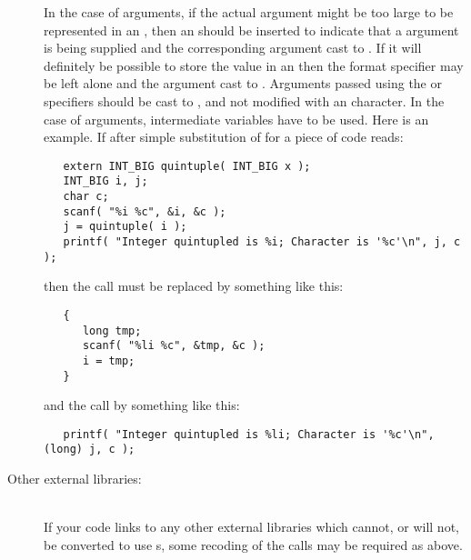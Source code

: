 \documentclass[twoside,11pt]{article}
\renewcommand{\_}{\texttt{\symbol{95}}}
\begin{document}
\begin{description}
In the case of  arguments, if the actual argument
might be too large to be
represented in an , then an  should be inserted to 
indicate that a  argument is being supplied and the 
corresponding argument cast to .  If it will definitely
be possible to store the value in an  then the format specifier
may be left alone and the argument cast to .
Arguments passed using the  or \cc{*} specifiers should be cast 
to , and not modified with an  character.
In the case of  arguments, intermediate variables have to be used.
Here is an example.  If after simple substitution of \cc{INT\_BIG} for
 a piece of code reads:
\begin{squote}
\begin{verbatim}
   extern INT_BIG quintuple( INT_BIG x );
   INT_BIG i, j;
   char c;
   scanf( "%i %c", &i, &c );
   j = quintuple( i );
   printf( "Integer quintupled is %i; Character is '%c'\n", j, c );
\end{verbatim}
\end{squote}
then the  call must be replaced by something like this: 
\begin{squote}
\begin{verbatim}
   {  
      long tmp; 
      scanf( "%li %c", &tmp, &c ); 
      i = tmp; 
   }
\end{verbatim}
\end{squote}
and the  call by something like this:
\begin{squote}
\begin{verbatim}
   printf( "Integer quintupled is %li; Character is '%c'\n", (long) j, c );
\end{verbatim}
\end{squote}
%
\item[Other external libraries:]\mbox{}
\\
If your code links to any other external libraries
which cannot, or will not, be converted to use \cc{INT\_BIG}s,
some recoding of the calls may be required as above.
\end{description}
\end{document}
